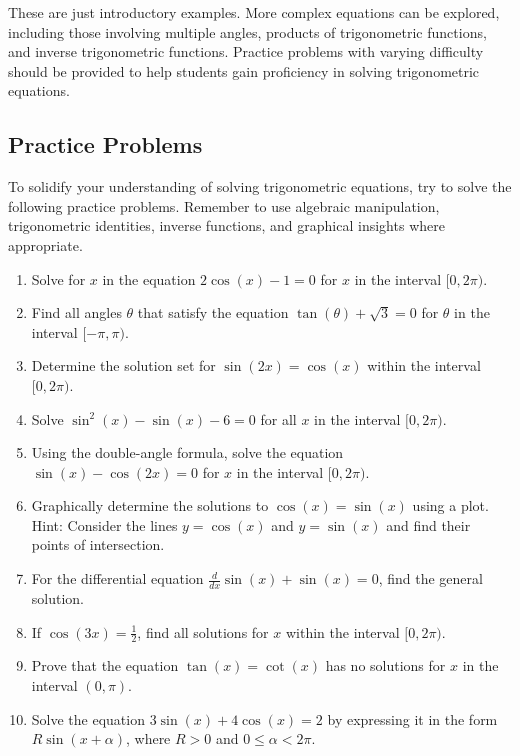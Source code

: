 \documentclass[a4paper,12pt]{book}
\newcounter{problem}
\begin{document}
These are just introductory examples. More complex equations can be explored, including those involving multiple angles, products of trigonometric functions, and inverse trigonometric functions. Practice problems with varying difficulty should be provided to help students gain proficiency in solving trigonometric equations.

\subsection{Practice Problems}
\label{subsec:practice_problems}

To solidify your understanding of solving trigonometric equations, try to solve the following practice problems. Remember to use algebraic manipulation, trigonometric identities, inverse functions, and graphical insights where appropriate.

\begin{enumerate}
    \item Solve for \( x \) in the equation \( 2\cos(x) - 1 = 0 \) for \( x \) in the interval \( [0, 2\pi) \).
    \item Find all angles \( \theta \) that satisfy the equation \( \tan(\theta) + \sqrt{3} = 0 \) for \( \theta \) in the interval \( [-\pi, \pi) \).
    \item Determine the solution set for \( \sin(2x) = \cos(x) \) within the interval \( [0, 2\pi) \).
    \item Solve \( \sin^2(x) - \sin(x) - 6 = 0 \) for all \( x \) in the interval \( [0, 2\pi) \).
    \item Using the double-angle formula, solve the equation \( \sin(x) - \cos(2x) = 0 \) for \( x \) in the interval \( [0, 2\pi) \).
    \item Graphically determine the solutions to \( \cos(x) = \sin(x) \) using a plot. Hint: Consider the lines \( y = \cos(x) \) and \( y = \sin(x) \) and find their points of intersection.
    \item For the differential equation \( \frac{d}{dx}\sin(x) + \sin(x) = 0 \), find the general solution.
    \item If \( \cos(3x) = \frac{1}{2} \), find all solutions for \( x \) within the interval \( [0, 2\pi) \).
    \item Prove that the equation \( \tan(x) = \cot(x) \) has no solutions for \( x \) in the interval \( (0, \pi) \).
    \item Solve the equation \( 3\sin(x) + 4\cos(x) = 2 \) by expressing it in the form \( R\sin(x + \alpha) \), where \( R > 0 \) and \( 0 \leq \alpha < 2\pi \).
\end{enumerate}
\end{document}
